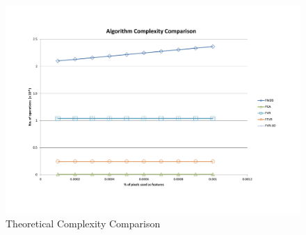 \begin{figure}
        \centering
        \includegraphics[width=5.0in]{images/theoreticalSpeedComparison}
        \caption{Theoretical Complexity Comparison}
        \label{fig:COMPLEX_COMP_CHART}
\end{figure}
